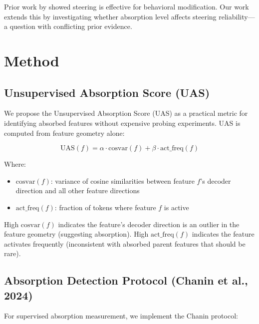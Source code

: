 \documentclass{article}
\begin{document}
Prior work by \citet{subramani2022steering} showed steering is effective for behavioral modification. Our work extends this by investigating whether absorption level affects steering reliability---a question with conflicting prior evidence.

\section{Method}

\subsection{Unsupervised Absorption Score (UAS)}

We propose the Unsupervised Absorption Score (UAS) as a practical metric for identifying absorbed features without expensive probing experiments. UAS is computed from feature geometry alone:

\begin{equation}
\text{UAS}(f) = \alpha \cdot \text{cosvar}(f) + \beta \cdot \text{act\_freq}(f)
\end{equation}

Where:
\begin{itemize}
  \item $\text{cosvar}(f)$: variance of cosine similarities between feature $f$'s decoder direction and all other feature directions
  \item $\text{act\_freq}(f)$: fraction of tokens where feature $f$ is active
\end{itemize}

High $\text{cosvar}(f)$ indicates the feature's decoder direction is an outlier in the feature geometry (suggesting absorption). High $\text{act\_freq}(f)$ indicates the feature activates frequently (inconsistent with absorbed parent features that should be rare).

\subsection{Absorption Detection Protocol (Chanin et al., 2024)}

For supervised absorption measurement, we implement the Chanin protocol:
\end{document}
